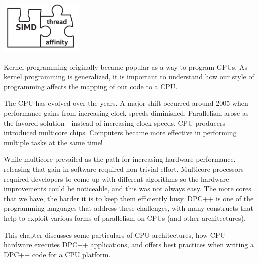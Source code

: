 \begin{center}
	\includegraphics[width=0.3\textwidth]{content/chapter-16/images/1}
\end{center}

Kernel programming originally became popular as a way to program GPUs. As kernel programming is generalized, it is important to understand how our style of programming affects the mapping of our code to a CPU.\par

The CPU has evolved over the years. A major shift occurred around 2005 when performance gains from increasing clock speeds diminished. Parallelism arose as the favored solution—instead of increasing clock speeds, CPU producers introduced multicore chips. Computers became more effective in performing multiple tasks at the same time!\par

While multicore prevailed as the path for increasing hardware performance, releasing that gain in software required non-trivial effort. Multicore processors required developers to come up with different algorithms so the hardware improvements could be noticeable, and this was not always easy. The more cores that we have, the harder it is to keep them efficiently busy. DPC++ is one of the programming languages that address these challenges, with many constructs that help to exploit various forms of parallelism on CPUs (and other architectures).\par

This chapter discusses some particulars of CPU architectures, how CPU hardware executes DPC++ applications, and offers best practices when writing a DPC++ code for a CPU platform.\par







